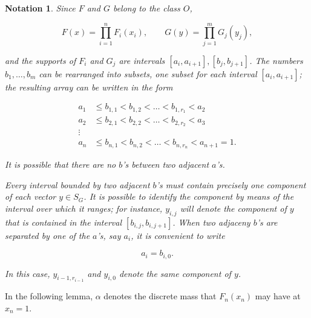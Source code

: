 \documentclass{article}
\newtheorem{notation}{Notation}
\begin{document}
\begin{notation}

Since $F$ and $G$ belong to the class $O$,

\[
F(x) = \prod_{i=1}^n F_i(x_i), \qquad G(y) = \prod_{j=1}^m G_j(y_j),
\]

and the supports of $F_i$ and $G_j$ are intervals $[a_i, a_{i+1}], [b_j,
b_{j+1}]$. The numbers $b_1, \dots, b_m$ can be rearranged into subsets, one
subset for each interval $[a_i, a_{i+1}]$; the resulting array can be written
in the form

\[
\begin{aligned}
a_1 &\leq b_{1,1} < b_{1, 2} < \dots < b_{1, r_1} < a_2 \\
a_2 &\leq b_{2,1} < b_{2, 2} < \dots < b_{2, r_2} < a_3 \\
\vdots & \\
a_n &\leq b_{n,1} < b_{n, 2} < \dots < b_{n, r_n} < a_{n+1} = 1.
\end{aligned}
\]

It is possible that there are no $b$'s between two adjacent $a$'s.

Every interval bounded by two adjacent $b$'s must contain precisely one
component of each vector $y \in S_G$. It is possible to identify the component
by means of the interval over which it ranges; for instance, $y_{i,j}$ will
denote the component of $y$ that is contained in the interval $[b_{i,j}, b_{i,
j+1}]$. When two adjaceny $b$'s are separated by one of the $a$'s, say $a_i$,
it is convenient to write

\[
    a_i = b_{i, 0}.
\]

In this case, $y_{i-1, r_{i-1}}$ and $y_{i, 0}$ denote the same component of
$y$.

\end{notation}

In the following lemma, $\alpha$ denotes the discrete mass that $F_n(x_n)$ may
have at $x_n = 1$.
\end{document}
